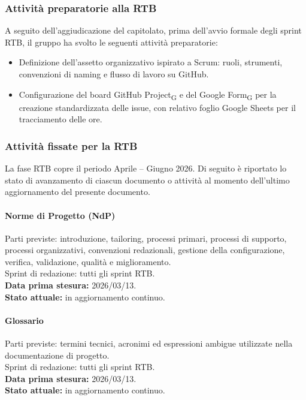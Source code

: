\subsubsection{Attività preparatorie alla RTB}
\label{sec:pre-rtb}

A seguito dell'aggiudicazione del capitolato, prima dell'avvio formale degli
sprint RTB, il gruppo ha svolto le seguenti attività preparatorie:
\begin{itemize}
\item Definizione dell'assetto organizzativo ispirato a Scrum: ruoli,
strumenti, convenzioni di naming e flusso di lavoro su GitHub.
\item Configurazione del board GitHub Project\textsubscript{G} e del Google
Form\textsubscript{G} per la creazione standardizzata delle issue,
con relativo foglio Google Sheets per il tracciamento delle ore.
\end{itemize}

\subsubsection{Attività fissate per la RTB}
\label{sec:attivita-rtb}

La fase RTB copre il periodo Aprile -- Giugno 2026. Di seguito è riportato lo
stato di avanzamento di ciascun documento o attività al momento dell'ultimo
aggiornamento del presente documento.

\paragraph{Norme di Progetto (NdP)}
Parti previste: introduzione, tailoring, processi primari, processi di supporto,
processi organizzativi, convenzioni redazionali, gestione della configurazione,
verifica, validazione, qualità e miglioramento.\\
Sprint di redazione: tutti gli sprint RTB.\\
\textbf{Data prima stesura:} 2026/03/13.\\
\textbf{Stato attuale:} in aggiornamento continuo.

\paragraph{Glossario}
Parti previste: termini tecnici, acronimi ed espressioni ambigue utilizzate nella
documentazione di progetto.\\
Sprint di redazione: tutti gli sprint RTB.\\
\textbf{Data prima stesura:} 2026/03/13.\\
\textbf{Stato attuale:} in aggiornamento continuo.

